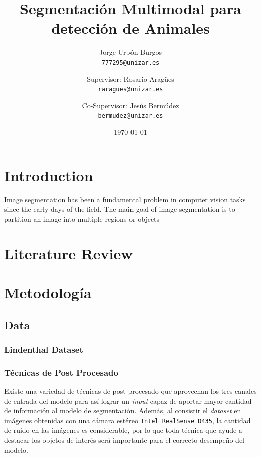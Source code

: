 \documentclass[12pt,a4paper]{report}
\title{Segmentación Multimodal para detección de Animales}
\author{
    Jorge Urbón Burgos \\
    \texttt{777295@unizar.es}
    \and
    Supervisor: Rosario Aragües \\
    \texttt{raragues@unizar.es}
    \and
    Co-Supervisor: Jesús Bermúdez \\
    \texttt{bermudez@unizar.es}
}
\date{\today}
\begin{document}
\maketitle

\begin{abstract}
\end{abstract}

\tableofcontents

\chapter{Introduction}
\label{chap:introduction}
Image segmentation has been a fundamental problem in computer vision tasks since the early days of the field. The main goal of image segmentation is to partition an image into multiple regions or objects

\chapter{Literature Review}
\label{chap:literature_review}

\chapter{Metodología}
\label{chap:methodology}
\section{Data}
\label{sec:data}
\subsection{Lindenthal Dataset}
\label{subsec:lindenthal_dataset}
\subsection{Técnicas de Post Procesado}
\label{subsec:tecnicas_post_procesado}
Existe una variedad de técnicas de post-procesado que aprovechan los tres canales de entrada del modelo para así lograr un \textit{input} capaz de aportar mayor cantidad de información al modelo de segmentación. Además, al consistir el \textit{dataset} en imágenes obtenidas con una cámara estéreo \texttt{Intel RealSense D435}, la cantidad de ruido en las imágenes es considerable, por lo que toda técnica que ayude a destacar los objetos de interés será importante para el correcto desempeño del modelo.
\end{document}
